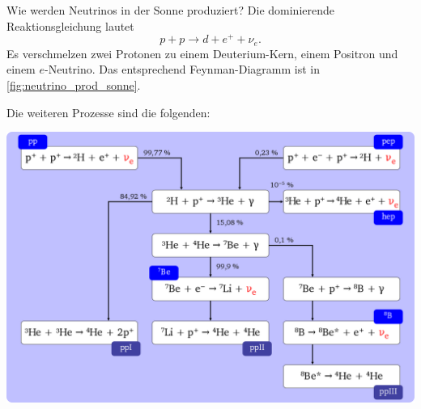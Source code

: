 \begin{fquestion}{Wie werden Neutrinos in der Sonne produziert?}
    Die dominierende Reaktionsgleichung lautet
    \[p + p \rightarrow d + e^+ + \nu_e.\]
    Es verschmelzen zwei Protonen zu einem Deuterium-Kern, einem Positron und einem $e$-Neutrino.
    Das entsprechend Feynman-Diagramm ist in \autoref{fig:neutrino_prod_sonne}.

    Die weiteren Prozesse sind die folgenden:
    
    \begin{center}
        \includegraphics[width=.9\linewidth]{img/1280px-Proton_proton_cycle.svg.png}
    \end{center}
    

\end{fquestion}

